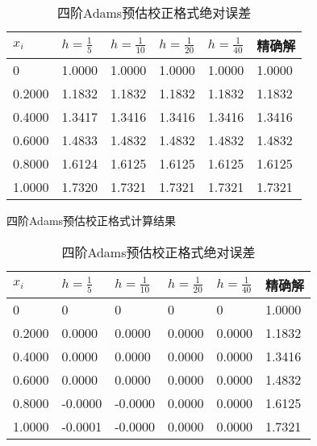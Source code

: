 \documentclass[12pt, a4paper, oneside]{ctexart}
\begin{document}

\begin{table}[h] %
    \centering
    \footnotesize
    \begin{minipage}[t]{0.48\textwidth}\centering
    \begin{tabular}{@{}llllll@{}}
        \toprule
        $x_i$      & $h=\frac{1}{5}$  & $h=\frac{1}{10}$ & $h=\frac{1}{20}$ & $h=\frac{1}{40}$ & 精确解    \\ \midrule 
        0      & 1.0000 & 1.0000 & 1.0000 & 1.0000 & 1.0000 \\
        0.2000 & 1.1832 & 1.1832 & 1.1832 & 1.1832 & 1.1832 \\
        0.4000 & 1.3417 & 1.3416 & 1.3416 & 1.3416 & 1.3416 \\
        0.6000 & 1.4833 & 1.4832 & 1.4832 & 1.4832 & 1.4832 \\
        0.8000 & 1.6124 & 1.6125 & 1.6125 & 1.6125 & 1.6125 \\
        1.0000 & 1.7320 & 1.7321 & 1.7321 & 1.7321 & 1.7321 \\ \bottomrule
        \end{tabular}
	\caption{四阶Adams预估校正格式计算结果} \label{fig:adams21}
    \end{minipage}
    \begin{minipage}[t]{0.48\textwidth}\centering
    \begin{tabular}{@{}llllll@{}}
        \toprule
        $x_i$      & $h=\frac{1}{5}$  & $h=\frac{1}{10}$ & $h=\frac{1}{20}$ & $h=\frac{1}{40}$ & 精确解    \\ \midrule 
        0      & 0       & 0       & 0      & 0      & 1.0000 \\
        0.2000 & 0.0000  & 0.0000  & 0.0000 & 0.0000 & 1.1832 \\
        0.4000 & 0.0000  & 0.0000  & 0.0000 & 0.0000 & 1.3416 \\
        0.6000 & 0.0000  & 0.0000  & 0.0000 & 0.0000 & 1.4832 \\
        0.8000 & -0.0000 & -0.0000 & 0.0000 & 0.0000 & 1.6125 \\
        1.0000 & -0.0001 & -0.0000 & 0.0000 & 0.0000 & 1.7321 \\ \bottomrule
        \end{tabular}
	\caption{四阶Adams预估校正格式绝对误差} \label{fig:adams22}
    \end{minipage}
\end{table}
\end{document}

